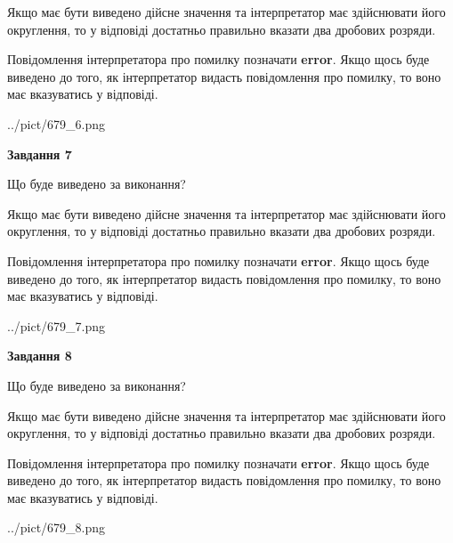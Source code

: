 \documentclass[12pt, ukrainian]{article}
\begin{document}
{\begin {Large}
Якщо має бути виведено дійсне значення та інтерпретатор має здійснювати його округлення, 
то у відповіді достатньо правильно вказати два дробових розряди.

Повідомлення інтерпретатора про помилку позначати \textbf{error}.
Якщо щось буде виведено до того, як інтерпретатор видасть повідомлення про помилку, 
то воно має вказуватись у відповіді. \par

\begin{center}
	{../pict/679_6.png}
\end{center}
\newpage

{\begin {center}\textbf{Завдання 7}\end {center}}\par
Що буде виведено за виконання? \par

Якщо має бути виведено дійсне значення та інтерпретатор має здійснювати його округлення, 
то у відповіді достатньо правильно вказати два дробових розряди.

Повідомлення інтерпретатора про помилку позначати \textbf{error}.
Якщо щось буде виведено до того, як інтерпретатор видасть повідомлення про помилку, 
то воно має вказуватись у відповіді. \par

\begin{center}
	{../pict/679_7.png}
\end{center}
\newpage

{\begin {center}\textbf{Завдання 8}\end {center}}\par
Що буде виведено за виконання? \par

Якщо має бути виведено дійсне значення та інтерпретатор має здійснювати його округлення, 
то у відповіді достатньо правильно вказати два дробових розряди.

Повідомлення інтерпретатора про помилку позначати \textbf{error}.
Якщо щось буде виведено до того, як інтерпретатор видасть повідомлення про помилку, 
то воно має вказуватись у відповіді. \par

\begin{center}
	{../pict/679_8.png}
\end{center}
\newpage


\end{Large}}
\end{document}
